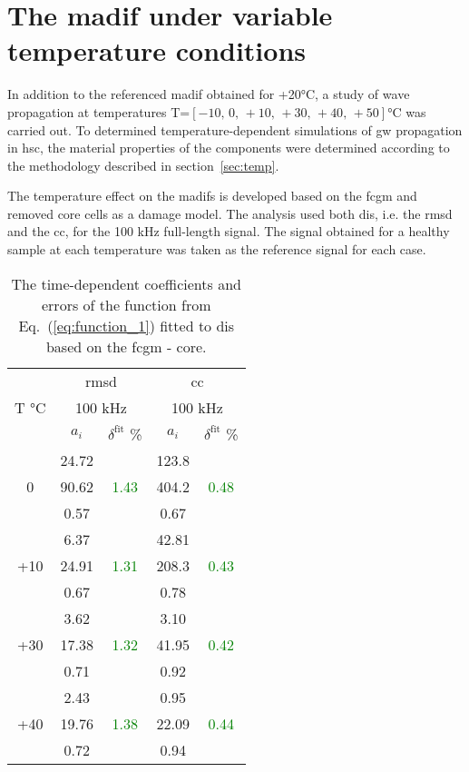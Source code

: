 \section{The \acs{madif} under variable temperature conditions}
\label{sec:madifTemp}

In addition to the referenced \ac{madif} obtained for +20\unit{\degreeCelsius}, a study of wave propagation at temperatures T=\(\left[-10,\,0,\,+10,\,+30,\,+40,\,+50\right]\)\unit{\degreeCelsius} was carried out.
To determined temperature-dependent simulations of \ac{gw} propagation in \ac{hsc}, the material properties of the components were determined according to the methodology described in section~\ref{sec:temp}.

The temperature effect on the \acp{madif} is developed based on the \ac{fcgm} and removed core cells as a damage model.
The analysis used both \acp{di}, i.e. the \ac{rmsd} and the \ac{cc}, for the 100 \unit{\kHz} full-length signal.
The signal obtained for a healthy sample at each temperature was taken as the reference signal for each case.
\begin{table}[!tbh]
	\small
	\tabcolsep=0.25cm
	\centering
	\caption{\label{tab:fit_F_err_temp} The time-dependent coefficients and errors of the function from Eq.~(\ref{eq:function_1}) fitted to \acp{di} based on the \acf{fcgm} - core.}
\begin{tabular}{c|cc|cc}
	\toprule \multirow{3}{*}{T \unit{\degreeCelsius}} & \multicolumn{2}{c|}{\ac{rmsd}} & \multicolumn{2}{c}{\ac{cc}}\\
	&\multicolumn{2}{c|}{100 \unit{\kHz}}&\multicolumn{2}{c}{100 \unit{\kHz}}\\
	& \(a_i\) &  \(\delta^{\mathrm{fit}}\) \% & \(a_i\) & \(\delta^{\mathrm{fit}}\) \%\\
	\midrule
	 \multirow{3}{*}{0} & 24.72 & \multirow{3}{*}{\textcolor{green}{1.43}}& 123.8 & \multirow{3}{*}{\textcolor{green}{0.48}}\\
	 & 90.62 & & 404.2 &\\
	 & 0.57 & & 0.67 &\\
	\midrule
	\multirow{3}{*}{+10} & 6.37 & \multirow{3}{*}{\textcolor{green}{1.31}}& 42.81 & \multirow{3}{*}{\textcolor{green}{0.43}}\\
	& 24.91 & & 208.3 &\\
	& 0.67 & & 0.78 &\\
	\midrule
	\multirow{3}{*}{+30} & 3.62 & \multirow{3}{*}{\textcolor{green}{1.32}}& 3.10 & \multirow{3}{*}{\textcolor{green}{0.42}}\\
	& 17.38 & & 41.95 &\\
	& 0.71 & & 0.92 &\\
	\midrule
	\multirow{3}{*}{+40} & 2.43 & \multirow{3}{*}{\textcolor{green}{1.38}}& 0.95 & \multirow{3}{*}{\textcolor{green}{0.44}}\\
	& 19.76 & & 22.09 &\\
	& 0.72 & & 0.94 &\\
	\bottomrule
\end{tabular}
\end{table}

